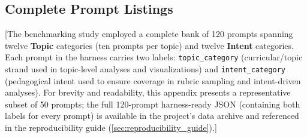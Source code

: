 \subsection{Complete Prompt Listings}
\label{app:prompts_listings}
\label{tab:prompt_bank}  %

[The benchmarking study employed a complete bank of 120 prompts spanning twelve \textbf{Topic} categories (ten prompts per topic) and twelve \textbf{Intent} categories. Each prompt in the harness carries two labels: \texttt{topic\_category} (curricular/topic strand used in topic-level analyses and visualizations) and \texttt{intent\_category} (pedagogical intent used to ensure coverage in rubric sampling and intent-driven analyses). For brevity and readability, this appendix presents a representative subset of 50 prompts; the full 120-prompt harness-ready JSON (containing both labels for every prompt) is available in the project's data archive and referenced in the reproducibility guide (\cref{sec:reproducibility_guide}).]

